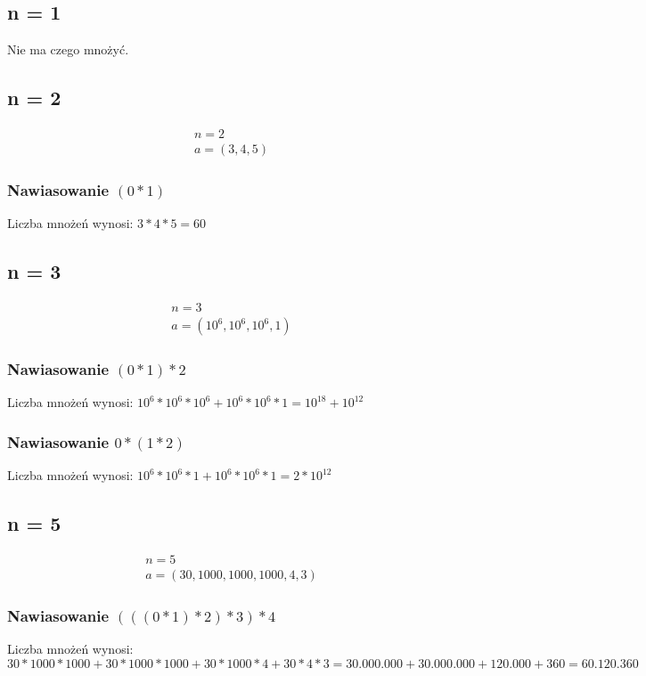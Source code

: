 \documentclass{article}
\begin{document}
\subsection{ n = 1}
Nie ma czego mnożyć.

\subsection{ n = 2}
\begin{gather*}
n = 2 \\
a = (3,4, 5)
\end{gather*}
\subsubsection{Nawiasowanie $ (0 * 1) $}
Liczba mnożeń wynosi: $ 3 * 4 * 5 = 60 $ 


\subsection{n = 3}
\begin{gather*}
n = 3 \\
a = (10^6,10^6, 10^6, 1)
\end{gather*}
\subsubsection{Nawiasowanie $ (0 * 1) * 2 $}
Liczba mnożeń wynosi: $ 10^6 * 10^6 * 10^6 + 10^6 * 10^6 * 1 = 10^{18} + 10^{12} $ 

\subsubsection{Nawiasowanie $ 0 * (1 * 2) $}
Liczba mnożeń wynosi: $ 10^6 * 10^6 * 1 + 10^6 * 10^6 * 1 = 2 * 10^{12} $

\subsection{n = 5}
\begin{gather*}
n = 5 \\
a = (30,1000,1000,1000,4,3)
\end{gather*}
\subsubsection{Nawiasowanie $ (((0 * 1) * 2) * 3) * 4 $}
Liczba mnożeń wynosi: $ 30 * 1000 * 1000 + 30 * 1000 * 1000 + 30 * 1000 * 4 + 30 * 4 * 3  = 30.000.000 + 30.000.000 + 120.000 + 360 = 60.120.360 $
\end{document}
